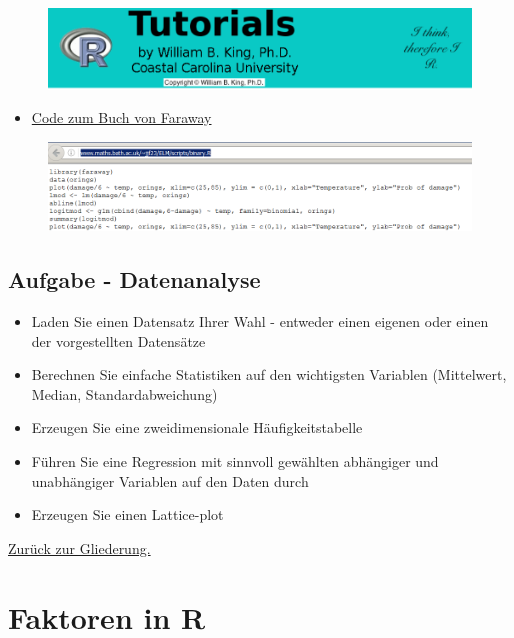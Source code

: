 \documentclass[]{article}
\providecommand{\tightlist}{%
  \setlength{\itemsep}{0pt}\setlength{\parskip}{0pt}}
\begin{document}
\begin{figure}[htbp]
\centering
\includegraphics{figure/Rtutorials.PNG}
\caption{}
\end{figure}

\begin{itemize}
\tightlist
\item
  \href{http://www.maths.bath.ac.uk/~jjf23/ELM/scripts/binary.R}{Code
  zum Buch von Faraway}
\end{itemize}

\begin{figure}[htbp]
\centering
\includegraphics{figure/orings.PNG}
\caption{}
\end{figure}

\subsection{Aufgabe - Datenanalyse}\label{aufgabe---datenanalyse}

\begin{itemize}
\tightlist
\item
  Laden Sie einen Datensatz Ihrer Wahl - entweder einen eigenen oder
  einen der vorgestellten Datensätze
\item
  Berechnen Sie einfache Statistiken auf den wichtigsten Variablen
  (Mittelwert, Median, Standardabweichung)
\item
  Erzeugen Sie eine zweidimensionale Häufigkeitstabelle
\item
  Führen Sie eine Regression mit sinnvoll gewählten abhängiger und
  unabhängiger Variablen auf den Daten durch
\item
  Erzeugen Sie einen Lattice-plot
\end{itemize}

\href{https://github.com/Japhilko/IntroR/blob/master/2017/README.md}{Zurück
zur Gliederung.}

\section{Faktoren in R}\label{faktoren-in-r}
\end{document}
